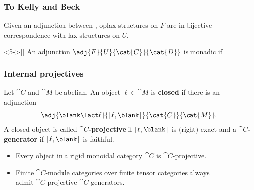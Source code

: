 \documentclass[aspectratio=169,12pt,professionalfont]{beamer}
\renewcommand*{\hom}[1]{\ensuremath{\lfloor#1\rfloor}}
\renewcommand*{\emph}{\textbf}
\begin{document}
\begin{frame}[t]\frametitle{To Kelly and Beck}
  \vspace{.5cm}
  \begin{theorem}
    Given an adjunction
    between
    ,
    oplax
    structures on \(F\) are in bijective correspondence with
    lax 
    structures on \(U\).
  \end{theorem}
  \vspace{1cm}
  \begin{theorem}<5->[]
    An adjunction \(\adj{F}{U}{\cat{C}}{\cat{D}}\) is monadic if
  \end{theorem}
\end{frame}

\begin{frame}\frametitle{Internal projectives}
  Let \(\cat{C}\) and \(\cat{M}\) be abelian.
  \pause%
  An object \(\ell \in \cat{M}\) is \emph{closed} if there is an adjunction
  \[
    \adj{\blank \lact \ell}{\hom{\ell, \blank}}{\cat{C}}{\cat{M}}.
  \]
  \pause%
  A closed object is called \emph{\(\cat{C}\)-projective} if \(\hom{\ell, \blank}\) is (right) exact
  \pause%
  and a \emph{\(\cat{C}\)-generator} if \(\hom{\ell, \blank}\) is faithful.
  \pause%
  \begin{example}
    \begin{itemize}
      \item Every object in a rigid monoidal category \(\cat{C}\) is \(\cat{C}\)-projective.\pause%
      \item Finite \(\cat{C}\)-module categories over finite tensor categories always\\
      admit \(\cat{C}\)-projective \(\cat{C}\)-generators.
    \end{itemize}
  \end{example}
\end{frame}
\end{document}
